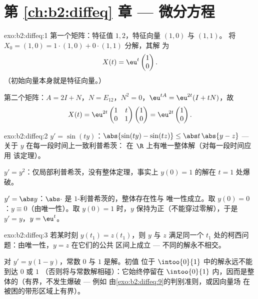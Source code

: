 \section*{第 \ref{ch:b2:diffeq} 章 --- 微分方程}

\begin{solution}{exo:b2:diffeq:1}
第一个矩阵：特征值 $1, 2$，特征向量 $(1,0)$ 与 $(1,1)$。
将 $X_0 = (1,0) = 1\cdot(1,0) + 0\cdot(1,1)$ 分解，其解
为
\[
X(t) = \eu^{t}\begin{pmatrix}1\\ 0\end{pmatrix} .
\]
（初始向量本身就是特征向量。）

第二个矩阵：$A = 2I + N$，$N = E_{12}$，$N^2 = 0$，$\eu^{tA} =
\eu^{2t}(I + tN)$，故
\[
X(t) = \eu^{2t}\begin{pmatrix} 1 & t\\ 0 & 1\end{pmatrix}
\begin{pmatrix}1\\ 0\end{pmatrix}
= \eu^{2t}\begin{pmatrix}1\\ 0\end{pmatrix}.
\]
\end{solution}

\begin{solution}{exo:b2:diffeq:2}
$y' = \sin(ty)$：$\abs{\sin(ty) - \sin(tz)} \leq \abs t\,\abs{y -
z}$ --- 关于 $y$ 在每一段时间上一致利普希茨：
在 $\R$ 上有唯一整体解（对每一段时间应用
该定理）。

$y' = y^2$：仅局部利普希茨，没有整体定理，事实上
$y(0) = 1$ 的解在 $t = 1$ 处爆破。

$y' = \abs y$：$\abs\cdot$ 是 $1$-利普希茨的，整体存在性与
唯一性成立。取 $y(0) = 0$：$y \equiv 0$（由唯一性）。取 $y(0)
= 1$ 时，$y$ 保持为正（不能穿过零解），于是 $y' =
y$，$y = \eu^t$。
\end{solution}

\begin{solution}{exo:b2:diffeq:3}
若某时刻 $y(t_1) = z(t_1)$，则 $y$ 与 $z$ 满足同一个
$t_1$ 处的柯西问题：由唯一性，$y = z$ 在它们的公共
区间上成立 --- 不同的解永不相交。

对 $y' = y(1-y)$，常数 $0$ 与 $1$ 是解。初值
位于 $\intoo{0}{1}$ 中的解永远不能到达 $0$ 或 $1$
（否则将与常数解相碰）：它始终停留在
$\intoo{0}{1}$ 内，因而是整体的（有界，不发生爆破 --- 例如
由\cref{exo:b2:diffeq:9}的判别准则，或因向量场
在被困的带形区域上有界）。
\end{solution}

